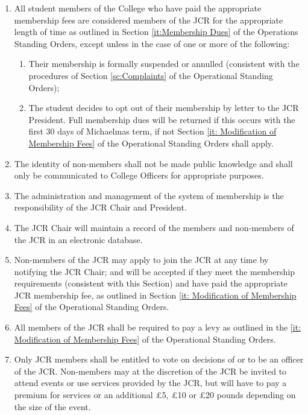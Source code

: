 \begin{enumerate}
    \item All student members of the College who have paid the appropriate membership fees are considered members of the JCR for the appropriate length of time as outlined in Section \ref{it:Membership Dues} of the Operations Standing Orders, except unless in the case of one or more of the following:
    \begin{enumerate}
        \item Their membership is formally suspended or annulled (consistent with the procedures of Section \ref{sc:Complaints} of the Operational Standing Orders);
        \item The student decides to opt out of their membership by letter to the JCR President. Full membership dues will be returned if this occurs with the first 30 days of Michaelmas term, if not Section \ref{it: Modification of Membership Fees} of the Operational Standing Orders shall apply.
    \end{enumerate}
    \item The identity of non-members shall not be made public knowledge and shall only be communicated to College Officers for appropriate purposes.
    \item  The administration and management of the system of membership is the responsibility of the JCR Chair and President.
    \item The JCR Chair will maintain a record of the members and non-members of the JCR in an electronic database.
    \item Non-members of the JCR may apply to join the JCR at any time by notifying the JCR Chair; and will be accepted if they meet the membership requirements (consistent with this Section) and have paid the appropriate JCR membership fee, as outlined in Section \ref{it: Modification of Membership Fees} of the Operational Standing Orders.
    \item All members of the JCR shall be required to pay a levy as outlined in the \ref{it: Modification of Membership Fees} of the Operational Standing Orders. 
    \item Only JCR members shall be entitled to vote on decisions of or to be an officer of the JCR. Non-members may at the discretion of the JCR be invited to attend events or use services provided by the JCR, but will have to pay a premium for services or an additional £5, £10 or £20 pounds depending on the size of the event.

\end{enumerate}
